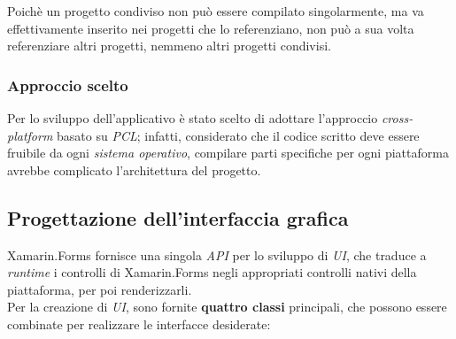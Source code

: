 Poichè un progetto condiviso non può essere compilato singolarmente, ma va effettivamente inserito nei progetti che lo referenziano, non può a sua volta referenziare altri progetti, nemmeno altri progetti condivisi.

\subsubsection{Approccio scelto}

Per lo sviluppo dell'applicativo è stato scelto di adottare l'approccio \textit{cross-platform} basato su \textit{PCL}; infatti, considerato che il codice scritto deve essere fruibile da ogni \textit{sistema operativo}, compilare parti specifiche per ogni piattaforma avrebbe complicato l'architettura del progetto. 
\subsection{Progettazione dell'interfaccia grafica}
Xamarin.Forms fornisce una singola \textit{API} per lo sviluppo di \textit{UI}, che traduce a \textit{runtime} i controlli di Xamarin.Forms negli appropriati controlli nativi della piattaforma, per poi renderizzarli.
\\
Per la creazione di \textit{UI}, sono fornite \textbf{quattro classi} principali, che possono essere combinate per realizzare le interfacce desiderate:
